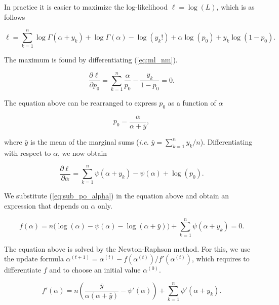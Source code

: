 \documentclass[12pt]{article}
\begin{document}
\begin{appendices}
    In practice it is easier to maximize the log-likelihood
    $\ell = \log(L)$, which is as follows

    \begin{equation}
\label{eq:ml_nm}
      \ell = \sum_{k=1}^n \log\Gamma(\alpha+y_k) +
      \log\Gamma(\alpha) -\log(y_k!) + 
      \alpha \log(p_0) + y_k\log(1-p_0).
    \end{equation}

    The maximum is found by differentiating (\ref{eq:ml_nm}).

    \begin{equation*}
      \frac{\partial\ell}{\partial p_0} = \sum_{k=1}^n
      \frac{\alpha}{p_0}-\frac{y_k}{1-p_0} = 0.
    \end{equation*}

    The equation above can be rearranged to express $p_0$ as
    a function of $\alpha$

    \begin{equation}
\label{eq:sub_po_alpha}
      p_0 = \frac{\alpha}{\alpha + \bar{y}},
    \end{equation}

    \noindent
    where $\bar{y}$ is the mean of the marginal sums (\textit{i.e.}
    $\bar{y} = \sum_{k=1}^ny_k / n$). Differentiating with respect
    to $\alpha$, we now obtain

    \begin{equation*}
      \frac{\partial\ell}{\partial\alpha} = \sum_{k=1}^n
      \psi(\alpha+y_k) - \psi(\alpha) + \log(p_0).
    \end{equation*}

    We substitute (\ref{eq:sub_po_alpha}) in the equation above
    and obtain an expression that depends on $\alpha$ only.

    \begin{equation}
\label{eq:NR_f}
      f(\alpha) = n \Big(\log(\alpha) - \psi(\alpha) 
      - \log (\alpha + \bar{y}) \Big)
      + \sum_{k=1}^n \psi(\alpha+y_k) = 0.
    \end{equation}

    The equation above is solved by the Newton-Raphson method. For
    this, we use the update formula
    $\alpha^{(t+1)} = \alpha^{(t)} - f(\alpha^{(t)})/f'(\alpha^{(t)})$,
    which requires to differentiate $f$ and to choose an initial
    value $\alpha^{(0)}$.

    \begin{equation*}
      f'(\alpha) = n \left(\frac{\bar{y}} {\alpha(\alpha+\bar{y})}
      -\psi'(\alpha) \right)
      + \sum_{k=1}^n \psi'(\alpha+y_k).
    \end{equation*}


\end{appendices}
\end{document}
